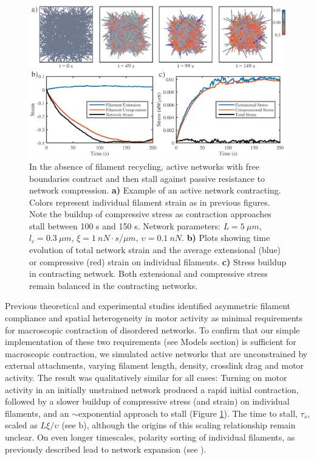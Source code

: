 \documentclass[10pt,letterpaper]{article}
\begin{document}
\begin{figure}[h!]
	\centering
	\includegraphics[width=\hsize]{figures/figure5}
	\caption{\label{fig:active_con} In the absence of filament recycling, active networks with free boundaries contract and then stall against passive resistance to network compression. \textbf{a)}  Example of an active network contracting. Colors represent individual filament strain as in previous figures.  Note the buildup of compressive stress as contraction approaches stall between 100 s and 150 s.  Network parameters: $L=5\: \mu m$, $l_c=0.3\: \mu m$, $\xi=1\: nN\cdot s/\mu m$, $\upsilon=0.1\: nN$.  \textbf{b)} Plots showing time evolution of total network strain and  the average extensional (blue) or compressive (red) strain on individual filaments.   \textbf{c)} Stress buildup in contracting network.  Both extensional and compressive stress remain balanced in the contracting networks.}
\end{figure}

Previous theoretical and experimental studies\cite{1367-2630-14-3-033037,rheo_2D1,rheo_active} identified asymmetric filament compliance and spatial heterogeneity in motor activity  as minimal requirements for macroscopic contraction of disordered networks. To confirm that our simple implementation of these two requirements (see Models section) is sufficient for macroscopic contraction, we simulated active networks that are unconstrained by external attachments, varying filament length, density, crosslink drag and motor activity.  The result was qualitatively similar for all cases:  Turning on motor activity in an initially unstrained network produced a rapid initial contraction, followed by a slower buildup of compressive stress (and strain) on individual filaments, and an $\sim$exponential approach to stall (Figure \ref{fig:active_con}). The time to stall, $\tau_s$, scaled as $L\xi/\upsilon$ (see b), although the origins of this scaling relationship remain unclear. On even longer timescales, polarity sorting of individual filaments, as previously described \cite{Reymann1310,Murrell15062014,Ndlec:1997aa,Surrey1167} lead to network expansion (see ).
\end{document}
